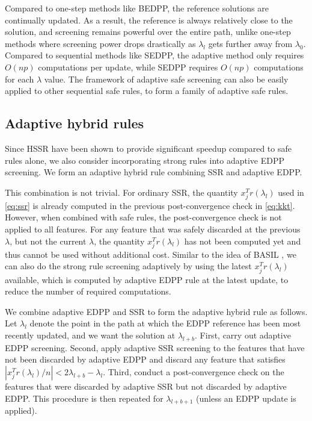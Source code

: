 Compared to one-step methods like BEDPP, the reference solutions are continually updated.  As a result, the reference is always relatively close to the solution, and screening remains powerful over the entire path, unlike one-step methods where screening power drops drastically as $\lambda_l$ gets further away from $\lambda_0$. Compared to sequential methods like SEDPP, the adaptive method only requires $O(np)$ computations per update, while SEDPP requires $O(np)$ computations for each $\lambda$ value. The framework of adaptive safe screening can also be easily applied to other sequential safe rules, to form a family of adaptive safe rules.

\subsection{Adaptive hybrid rules}

Since HSSR \citep{Zeng2021} have been shown to provide significant speedup compared to safe rules alone, we also consider incorporating strong rules into adaptive EDPP screening. We form an adaptive hybrid rule combining SSR and adaptive EDPP.

This combination is not trivial. For ordinary SSR, the quantity $x_j^Tr(\lambda_l)$ used in \eqref{eq:ssr} is already computed in the previous post-convergence check in \eqref{eq:kkt}. However, when combined with safe rules, the post-convergence check is not applied to all features. For any feature that was safely discarded at the previous $\lambda$, but not the current $\lambda$, the quantity $x_j^Tr(\lambda_l)$ has not been computed yet and thus cannot be used without additional cost. Similar to the idea of BASIL \citep{qian2019fast}, we can also do the strong rule screening adaptively by using the latest $x_j^Tr(\lambda_l)$ available, which is computed by adaptive EDPP rule at the latest update, to reduce the number of required computations.

We combine adaptive EDPP and SSR to form the adaptive hybrid rule as follows. Let $\lambda_l$ denote the point in the path at which the EDPP reference has been most recently updated, and we want the solution at $\lambda_{l+b}$. First, carry out adaptive EDPP screening. Second, apply adaptive SSR screening to the features that have not been discarded by adaptive EDPP and discard any feature that satisfies $|x_j^Tr(\lambda_l)/n|<2\lambda_{l+b}-\lambda_l$. Third, conduct a post-convergence check on the features that were discarded by adaptive SSR but not discarded by adaptive EDPP. This procedure is then repeated for $\lambda_{l+b+1}$ (unless an EDPP update is applied).

